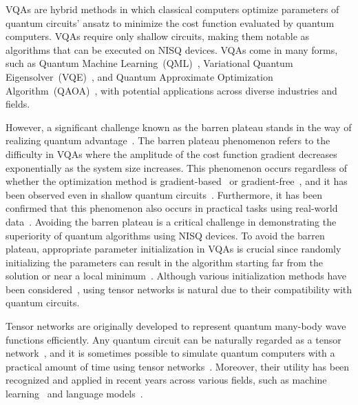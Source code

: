 \documentclass[12pt,dvipdfmx,twoside,openright]{report}
\begin{document}
VQAs are hybrid methods in which classical computers optimize parameters of quantum circuits' ansatz to minimize the cost function evaluated by quantum computers.
VQAs require only shallow circuits, making them notable as algorithms that can be executed on NISQ devices.
VQAs come in many forms, such as Quantum Machine Learning~(QML)~\cite{qml0,qml1,qml2}, Variational Quantum Eigensolver~(VQE)~\cite{vqe0,vqe1,vqe2}, and Quantum Approximate Optimization Algorithm~(QAOA)~\cite{qaoa0,qaoa1,qaoa2}, with potential applications across diverse industries and fields.

However, a significant challenge known as the barren plateau stands in the way of realizing quantum advantage~\cite{barrenplateau1,barrenplateau2}.
The barren plateau phenomenon refers to the difficulty in VQAs where the amplitude of the cost function gradient decreases exponentially as the system size increases.
This phenomenon occurs regardless of whether the optimization method is gradient-based~\cite{gradient-based} or gradient-free~\cite{gradient-free}, and it has been observed even in shallow quantum circuits~\cite{barrenplateau-shallow}.
Furthermore, it has been confirmed that this phenomenon also occurs in practical tasks using real-world data~\cite{barren-generic0,barren-generic1,barren-generic2}.
Avoiding the barren plateau is a critical challenge in demonstrating the superiority of quantum algorithms using NISQ devices.
To avoid the barren plateau, appropriate parameter initialization in VQAs is crucial since randomly initializing the parameters can result in the algorithm starting far from the solution or near a local minimum~\cite{qaoa2}.
Although various initialization methods have been considered~\cite{avoid-barren0,avoid-barren1,avoid-barren2}, using tensor networks is natural due to their compatibility with quantum circuits.

Tensor networks are originally developed to represent quantum many-body wave functions efficiently.
Any quantum circuit can be naturally regarded as a tensor network~\cite{tn-qc}, and it is sometimes possible to simulate quantum computers with a practical amount of time using tensor networks~\cite{google-ibm}.
Moreover, their utility has been recognized and applied in recent years across various fields, such as machine learning~\cite{tnml} and language models~\cite{tnlanguage}.
\end{document}
